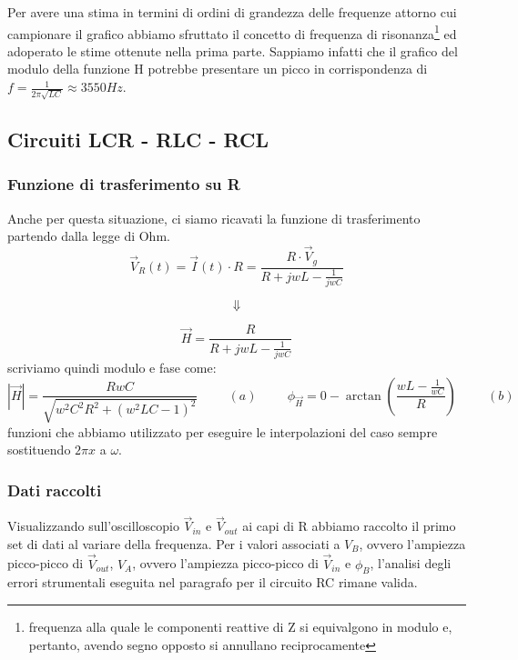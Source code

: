 \documentclass{article}
\theoremstyle{definition}
\begin{document}
\noindent Per avere una stima in termini di ordini di grandezza delle frequenze attorno cui campionare il grafico abbiamo sfruttato il concetto di frequenza di risonanza\footnote{frequenza alla quale le componenti reattive di Z si equivalgono in modulo e, pertanto, avendo segno opposto si annullano reciprocamente} ed adoperato le stime ottenute nella prima parte. Sappiamo infatti che il grafico del modulo della funzione H potrebbe presentare un picco in corrispondenza di \(f = \frac{1}{2\pi\sqrt{LC}} \approx 3550 Hz\).

\subsection{Circuiti LCR - RLC - RCL}
\subsubsection{Funzione di trasferimento su R}
Anche per questa situazione, ci siamo ricavati la funzione di trasferimento partendo dalla legge di Ohm.
\[\vec{V}_{R}(t)= \vec{I}(t) \cdot R = \frac{R \cdot \vec{V}_{g}}{R+jwL-\frac{1}{jwC}}\]

\[\Downarrow\]

\[\vec{H} = \frac{R}{R+jwL-\frac{1}{jwC}} \]
scriviamo quindi modulo e fase come:
\[\left|\vec{H}\right|=\frac{RwC}{\sqrt{w^{2} C^{2} R^{2} +(w^{2}LC-1)^{2}}}\hspace{1cm} (a) \hspace{1cm} \phi_{\vec{H}}= 0 - \arctan\left(\frac{wL-\frac{1}{wC}}{R}\right)\hspace{1cm} (b)\]
funzioni che abbiamo utilizzato per eseguire le interpolazioni del caso sempre sostituendo \(2 \pi x\) a \(\omega\). 

\pagebreak
\subsubsection*{Dati raccolti}
Visualizzando sull'oscilloscopio \(\vec{V}_{in}\) e \(\vec{V}_{out}\) ai capi di R abbiamo raccolto il primo set di dati al variare della frequenza. Per i valori associati a \(V_{B}\), ovvero l'ampiezza picco-picco di \(\vec{V}_{out}\), \(V_{A}\), ovvero l'ampiezza picco-picco di \(\vec{V}_{in}\) e \(\phi_{B}\), l'analisi degli errori strumentali eseguita nel paragrafo per il circuito RC rimane valida. 
\end{document}
